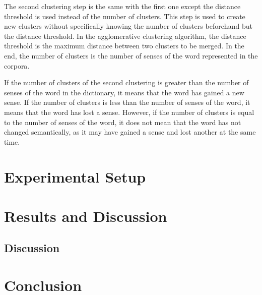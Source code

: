 \documentclass[11pt]{article}
\begin{document}
The second clustering step is the same with the first one except the distance threshold is used instead of the number of clusters.
This step is used to create new clusters without specifically knowing the number of clusters beforehand but the distance threshold.
In the agglomerative clustering algorithm, the distance threshold is the maximum distance between two clusters to be merged.
In the end, the number of clusters is the number of senses of the word represented in the corpora.

If the number of clusters of the second clustering is greater than the number of senses of the word in the dictionary, it means that the word has gained a new sense.
If the number of clusters is less than the number of senses of the word, it means that the word has lost a sense.
However, if the number of clusters is equal to the number of senses of the word, it does not mean that the word has not changed semantically, as it may have gained a sense and lost another at the same time.

\section{Experimental Setup}

\section{Results and Discussion}

\subsection{Discussion}

\section{Conclusion}



\end{document}
